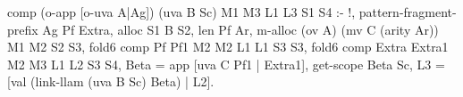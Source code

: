  comp (o-app [o-uva A|Ag]) (uva B Sc) M1 M3 L1 L3 S1 S4 :- !,
    pattern-fragment-prefix Ag Pf Extra, alloc S1 B S2,
    len Pf Ar, m-alloc (ov A) (mv C (arity Ar)) M1 M2 S2 S3,
    fold6 comp Pf    Pf1    M2 M2 L1 L1 S3 S3,
    fold6 comp Extra Extra1 M2 M3 L1 L2 S3 S4,
    Beta = app [uva C Pf1 | Extra1],
    get-scope Beta Sc, 
    L3 = [val (link-llam (uva B Sc) Beta) | L2].
